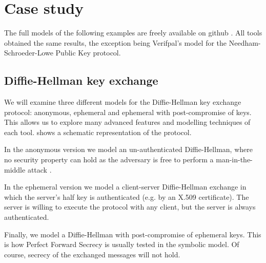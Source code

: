 
\section{Case study}
\label{section:case-study}

The full models of the following examples are freely available on github \cite{CaseStudies}. All tools obtained the same results, the exception being Verifpal's model for the Needham-Schroeder-Lowe Public Key protocol.

\subsection{Diffie-Hellman key exchange}

We will examine three different models for the Diffie-Hellman key exchange protocol: anonymous, ephemeral and ephemeral with post-compromise of keys. This allows us to explore many advanced features and modelling techniques of each tool.  shows a schematic representation of the protocol.

In the anonymous version we model an un-authenticated Diffie-Hellman, where no security property can hold as the adversary is free to perform a man-in-the-middle attack \cite{MITM-DH}.

In the ephemeral version we model a client-server Diffie-Hellman exchange in which the server's half key is authenticated (e.g. by an X.509 certificate). The server is willing to execute the protocol with any client, but the server is always authenticated.

Finally, we model a Diffie-Hellman with post-compromise of ephemeral keys. This is how Perfect Forward Secrecy \cite{PFS} is usually tested in the symbolic model. Of course, secrecy of the exchanged messages will not hold.


